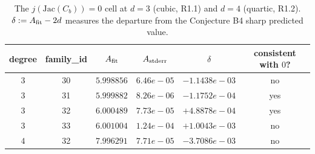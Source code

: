 \begin{table}[h]
\centering
\caption{The $j(\mathrm{Jac}(C_b)) = 0$ cell at $d=3$ (cubic, R1.1) and
$d=4$ (quartic, R1.2). $\delta := A_{\rm fit} - 2d$ measures the
departure from the Conjecture B4 sharp predicted value.}
\label{tab:r12-jzero-cell}
\begin{tabular}{cccccc}
\hline
degree & family\_id & $A_{\rm fit}$ & $A_{\rm stderr}$ & $\delta$ & consistent with $0$? \\
\hline
  $3$ & 30 & $5.998856$ & $6.46e-05$ & $-1.1438e-03$ & no \\
  $3$ & 31 & $5.999882$ & $8.26e-06$ & $-1.1752e-04$ & yes \\
  $3$ & 32 & $6.000489$ & $7.73e-05$ & $+4.8878e-04$ & yes \\
  $3$ & 33 & $6.001004$ & $1.24e-04$ & $+1.0043e-03$ & no \\
  $4$ & 32 & $7.996291$ & $7.71e-05$ & $-3.7086e-03$ & no \\
\hline
\end{tabular}
\end{table}
